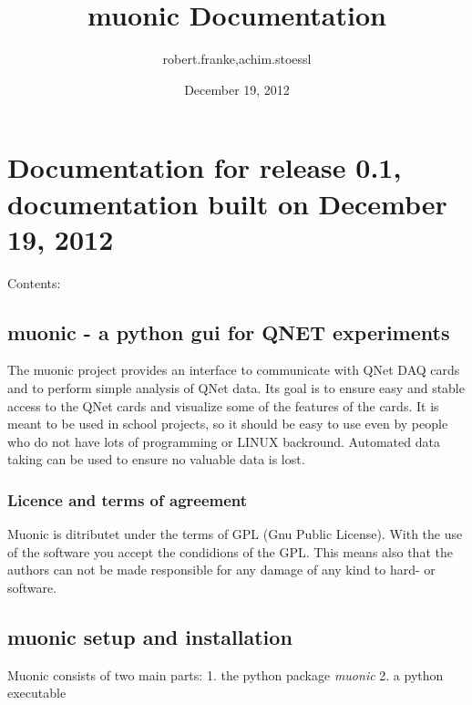 \documentclass[letterpaper,10pt,english]{sphinxmanual}
\title{muonic Documentation}
\date{December 19, 2012}
\author{robert.franke,achim.stoessl}
\begin{document}
\maketitle
\tableofcontents
{}\label{index::doc}



\chapter{Documentation for release 0.1, documentation built on December 19, 2012}
\label{index:welcome-to-muonic-documentation}\label{index:documentation-for-release-release-documentation-built-on-today}
Contents:


\section{muonic - a python gui for QNET experiments}
\label{intro::doc}\label{intro:muonic-a-python-gui-for-qnet-experiments}
The muonic project provides an interface to communicate with QNet DAQ cards and to perform simple analysis of QNet data.
Its goal is to ensure easy and stable access to the QNet cards and visualize some of the features of the cards. It is meant to be used in school projects, so it should be easy to use even by people who do not have lots of programming or LINUX backround. Automated data taking can be used to ensure no valuable data is lost.


\subsection{Licence and terms of agreement}
\label{intro:licence-and-terms-of-agreement}
Muonic is ditributet under the terms of GPL (Gnu Public License). With the use of the software you accept the condidions of the GPL. This means also that the authors can not be made responsible for any damage of any kind to hard- or software.


\section{muonic setup and installation}
\label{setup::doc}\label{setup:muonic-setup-and-installation}
Muonic consists of two main parts:
1. the python package \emph{muonic}
2. a python executable
\end{document}
